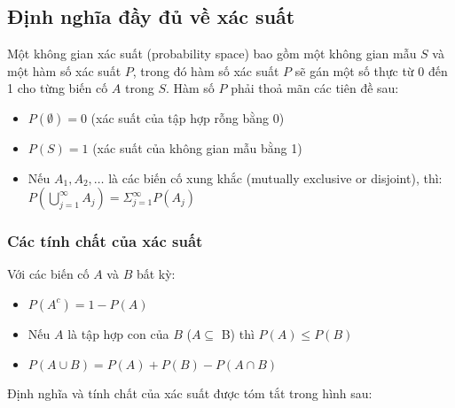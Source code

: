 \documentclass[
]{book}
\providecommand{\tightlist}{%
  \setlength{\itemsep}{0pt}\setlength{\parskip}{0pt}}
\begin{document}
\hypertarget{ux111ux1ecbnh-nghux129a-ux111ux1ea7y-ux111ux1ee7-vux1ec1-xuxe1c-suux1ea5t}{%
\subsection{Định nghĩa đầy đủ về xác suất}\label{ux111ux1ecbnh-nghux129a-ux111ux1ea7y-ux111ux1ee7-vux1ec1-xuxe1c-suux1ea5t}}

Một không gian xác suất (probability space) bao gồm một không gian mẫu \(S\) và một hàm số xác suất \(P\), trong đó hàm số xác suất \(P\) sẽ gán một số thực từ 0 đến 1 cho từng biến cố \(A\) trong \(S\). Hàm số \(P\) phải thoả mãn các tiên đề sau:

\begin{itemize}
\tightlist
\item
  \(P(\emptyset) = 0\) (xác suất của tập hợp rỗng bằng 0)
\item
  \(P(S) = 1\) (xác suất của không gian mẫu bằng 1)
\item
  Nếu \(A_1,A_2,\dots\) là các biến cố xung khắc (mutually exclusive or disjoint), thì: \(P(\bigcup\limits_{j=1}^{\infty} A_{j}) = \Sigma_{j=1}^{\infty}P(A_{j})\)
\end{itemize}

\hypertarget{cuxe1c-tuxednh-chux1ea5t-cux1ee7a-xuxe1c-suux1ea5t}{%
\subsubsection{Các tính chất của xác suất}\label{cuxe1c-tuxednh-chux1ea5t-cux1ee7a-xuxe1c-suux1ea5t}}

Với các biến cố \(A\) và \(B\) bất kỳ:

\begin{itemize}
\tightlist
\item
  \(P(A^c) = 1 - P(A)\)
\item
  Nếu \(A\) là tập hợp con của \(B\) (\(A \subseteq\) B) thì \(P(A) \leq P(B)\)
\item
  \(P(A \cup B) = P(A) + P(B) - P(A \cap B)\)
\end{itemize}

Định nghĩa và tính chất của xác suất được tóm tắt trong hình sau:
\end{document}
